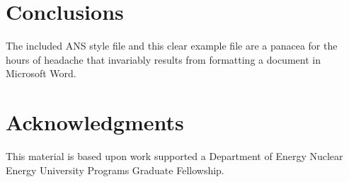\documentclass{anstrans}
\begin{document}
\section{Conclusions}

The included ANS style file and this clear example file are a panacea for
the hours of headache that invariably results from formatting a document in
Microsoft Word.

\section{Acknowledgments}
This material is based upon work supported a Department of Energy Nuclear
Energy University Programs Graduate Fellowship.



\end{document}
